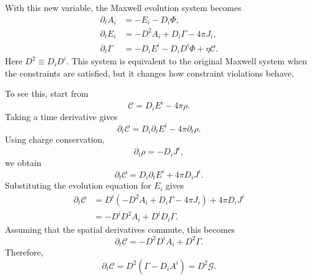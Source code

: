 With this new variable, the Maxwell evolution system becomes
\begin{align}
\partial_t A_i
&=
-E_i
-
D_i\Phi ,
\\
\partial_t E_i
&=
-D^2A_i
+
D_i\Gamma
-
4\pi J_i ,
\\
\partial_t\Gamma
&=
-D_iE^i
-
D_iD^i\Phi
+
\eta\mathcal{C}.
\end{align}
Here $D^2\equiv D_iD^i$. This system is equivalent to the original Maxwell system when the constraints are satisfied, but it changes how constraint violations behave.

To see this, start from
\begin{equation}
\mathcal{C}
=
D_iE^i
-
4\pi\rho .
\end{equation}
Taking a time derivative gives
\begin{equation}
\partial_t\mathcal{C}
=
D_i\partial_t E^i
-
4\pi\partial_t\rho .
\end{equation}
Using charge conservation,
\begin{equation}
\partial_t\rho
=
-D_i J^i ,
\end{equation}
we obtain
\begin{equation}
\partial_t\mathcal{C}
=
D_i\partial_t E^i
+
4\pi D_i J^i .
\end{equation}
Substituting the evolution equation for $E_i$ gives
\begin{align}
\partial_t\mathcal{C}
&=
D^i
\left(
-D^2A_i
+
D_i\Gamma
-
4\pi J_i
\right)
+
4\pi D_iJ^i
\\
&=
-D^iD^2A_i
+
D^iD_i\Gamma .
\end{align}
Assuming that the spatial derivatives commute, this becomes
\begin{equation}
\partial_t\mathcal{C}
=
-D^2D^iA_i
+
D^2\Gamma .
\end{equation}
Therefore,
\begin{equation}
\partial_t\mathcal{C}
=
D^2
\left(
\Gamma-D_iA^i
\right)
=
D^2\mathcal{G}.
\end{equation}


